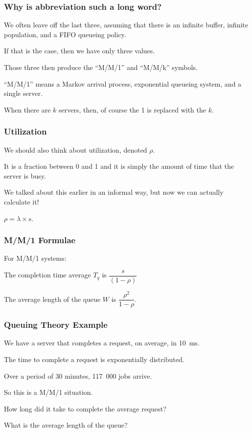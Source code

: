 \begin{frame}
\frametitle{Why is abbreviation such a long word?}

We often leave off the last three, assuming that there is an infinite buffer, infinite population, and a FIFO queueing policy. 

If that is the case, then we have only three values. 

Those three then produce the ``M/M/1'' and ``M/M/k'' symbols. 

``M/M/1'' means a Markov arrival process, exponential queueing system, and a single server. 

When there are $k$ servers, then, of course the 1 is replaced with the $k$. 

\end{frame}



\begin{frame}
\frametitle{Utilization}

We should also think about utilization, denoted $\rho$. 

It is a fraction between 0 and 1 and it is simply the amount of time that the server is busy. 

We talked about this earlier in an informal way, but now we can actually calculate it! 

$\rho = \lambda \times s$.

\end{frame}



\begin{frame}
\frametitle{M/M/1 Formulae}

For M/M/1 systems: 

The completion time average $T_{q}$ is $\dfrac{s}{(1-\rho)}$

The average length of the queue $W$ is $\dfrac{\rho^{2}}{1-\rho}$.

\end{frame}



\begin{frame}
\frametitle{Queuing Theory Example}

We have a server that completes a request, on average, in 10~ms. 

The time to complete a request is exponentially distributed. 

Over a period of 30 minutes, 117~000 jobs arrive. 

So this is a M/M/1 situation. 

How long did it take to complete the average request? 

What is the average length of the queue?

\end{frame}



